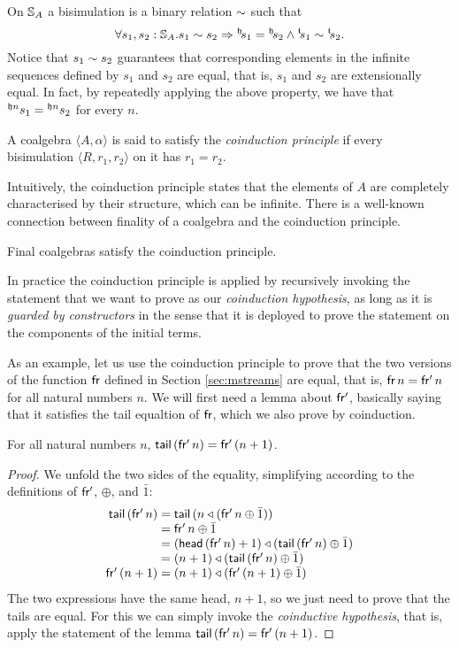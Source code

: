 On $\stream{A}$ a bisimulation is a binary relation $\bisim$ such that
$$
\forall s_1, s_2:\stream{A}. s_1 \bisim s_2 \Rightarrow
\hd{s_1} =\hd{s_2} \land
\tl{s_1}\bisim \tl{s_2}.
$$
Notice that $s_1\bisim s_2$ guarantees that corresponding elements in the infinite sequences defined by $s_1$ and $s_2$ are equal, that is, $s_1$ and $s_2$ are extensionally equal.
In fact, by repeatedly applying the above property, we have that $\heads{s_1}{n} = \heads{s_2}{n}$ for every $n$. 

\begin{definition}\label{def:coinduction}
A coalgebra $\langle A,\alpha\rangle$ is said to satisfy the {\em coinduction principle} if every bisimulation $\langle R,r_1,r_2\rangle$ on it has $r_1=r_2$.
\end{definition}

Intuitively, the coinduction principle states that the elements of $A$ are completely characterised by their structure, which can be infinite.
There is a well-known connection between finality of a coalgebra and the coinduction principle.

\begin{theorem}\label{th:coinduction}
Final coalgebras satisfy the coinduction principle.
\end{theorem}

In practice the coinduction principle is applied by recursively invoking the statement that we want to prove as our {\em coinduction hypothesis}, as long as it is {\em guarded by constructors} in the sense that it is deployed  to prove the statement on the components of the initial  terms.

As an example, let us use the coinduction principle to prove that the two versions of the function $\sfr$ defined in Section \ref{sec:mstreams} are equal,
that is, $\sfr\,n = \sfp\,n$ for all natural numbers $n$.
We will first need a lemma about $\sfp$, basically saying that it satisfies the tail equaltion of $\sfr$, which we also prove by coinduction.
\begin{lemma}\label{lemma:sfp}
For all natural numbers $n$, $\tail\,(\sfp\,n) = \sfp\,(n+1)$.
\end{lemma}
\begin{proof}
We unfold the two sides of the equality, simplifying according to the definitions of $\sfp$, $\oplus$, and $\bar{1}$:
$$
\begin{array}{r@{{}={}}l}
\tail\,(\sfp\,n)
& \tail\,(n \scons (\sfp\,n \oplus \bar{1}))\\
& \sfp\,n \oplus \bar{1}\\
& (\head\,(\sfp\,n) +1) \scons (\tail\,(\sfp\,n)  \oplus \bar{1})\\
& (n+1) \scons (\tail\,(\sfp\,n)  \oplus \bar{1})\\
\sfp\,(n+1)
& (n+1) \scons (\sfp\,(n+1) \oplus \bar{1})
\end{array}
$$
The two expressions have the same head, $n+1$, so we just need to prove that the tails are equal.
For this we can simply invoke the {\em coinductive hypothesis}, that is, apply the statement of the lemma $\tail\,(\sfp\,n) = \sfp\,(n+1)$.
\end{proof}

